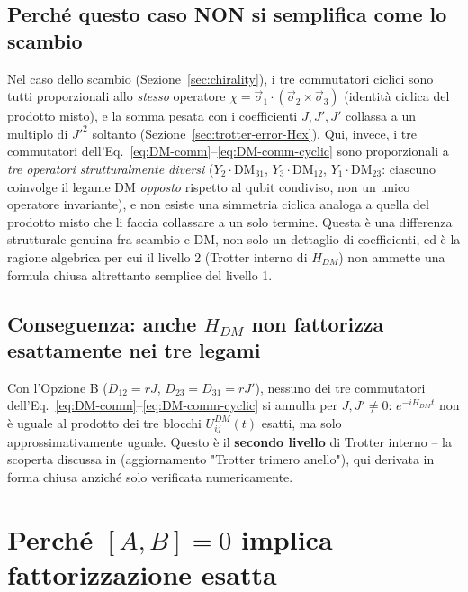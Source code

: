 \documentclass[11pt,a4paper]{article}
\begin{document}
\subsection{Perché questo caso NON si semplifica come lo scambio}

Nel caso dello scambio (Sezione~\ref{sec:chirality}), i tre commutatori ciclici sono tutti proporzionali allo \emph{stesso} operatore $\chi=\vec\sigma_1\cdot(\vec\sigma_2\times\vec\sigma_3)$ (identità ciclica del prodotto misto), e la somma pesata con i coefficienti $J,J',J'$ collassa a un multiplo di $J'^2$ soltanto (Sezione~\ref{sec:trotter-error-Hex}). Qui, invece, i tre commutatori dell'Eq.~\eqref{eq:DM-comm}--\eqref{eq:DM-comm-cyclic} sono proporzionali a \emph{tre operatori strutturalmente diversi} ($Y_2\cdot\text{DM}_{31}$, $Y_3\cdot\text{DM}_{12}$, $Y_1\cdot\text{DM}_{23}$: ciascuno coinvolge il legame DM \emph{opposto} rispetto al qubit condiviso, non un unico operatore invariante), e non esiste una simmetria ciclica analoga a quella del prodotto misto che li faccia collassare a un solo termine. Questa è una differenza strutturale genuina fra scambio e DM, non solo un dettaglio di coefficienti, ed è la ragione algebrica per cui il livello 2 (Trotter interno di $H_{DM}$) non ammette una formula chiusa altrettanto semplice del livello 1.

\subsection{Conseguenza: anche $H_{DM}$ non fattorizza esattamente nei tre legami}

Con l'Opzione B ($D_{12}=rJ$, $D_{23}=D_{31}=rJ'$), nessuno dei tre commutatori dell'Eq.~\eqref{eq:DM-comm}--\eqref{eq:DM-comm-cyclic} si annulla per $J,J'\neq0$: $e^{-iH_{DM}t}$ non è uguale al prodotto dei tre blocchi $U_{ij}^{DM}(t)$ esatti, ma solo approssimativamente uguale. Questo è il \textbf{secondo livello} di Trotter interno -- la scoperta discussa in \texttt{} (aggiornamento "Trotter trimero anello"), qui derivata in forma chiusa anziché solo verificata numericamente.

\section{Perché $[A,B]=0$ implica fattorizzazione esatta}
\label{sec:BCH}
\end{document}

